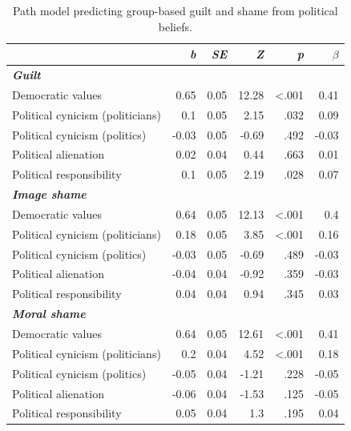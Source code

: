 \documentclass[
]{article}
\begin{document}
\begin{table}[H]
\centering
\caption{\label{tab:TableS1}Path model predicting group-based guilt and shame from political beliefs.}
\centering
\fontsize{8}{10}\selectfont
\begin{tabular}[t]{lrrrrr}
\toprule
\em{ } & \em{b} & \em{SE} & \em{Z} & \em{p} & \em{$\beta$}\\
\midrule
\em{\textbf{Guilt}} & \em{\textbf{}} & \em{\textbf{}} & \em{\textbf{}} & \em{\textbf{}} & \em{\textbf{}}\\
Democratic values & 0.65 & 0.05 & 12.28 & <.001 & 0.41\\
Political cynicism (politicians) & 0.1 & 0.05 & 2.15 & .032 & 0.09\\
Political cynicism (politics) & -0.03 & 0.05 & -0.69 & .492 & -0.03\\
Political alienation & 0.02 & 0.04 & 0.44 & .663 & 0.01\\
\addlinespace
Political responsibility & 0.1 & 0.05 & 2.19 & .028 & 0.07\\
\em{\textbf{Image shame}} & \em{\textbf{}} & \em{\textbf{}} & \em{\textbf{}} & \em{\textbf{}} & \em{\textbf{}}\\
Democratic values & 0.64 & 0.05 & 12.13 & <.001 & 0.4\\
Political cynicism (politicians) & 0.18 & 0.05 & 3.85 & <.001 & 0.16\\
Political cynicism (politics) & -0.03 & 0.05 & -0.69 & .489 & -0.03\\
\addlinespace
Political alienation & -0.04 & 0.04 & -0.92 & .359 & -0.03\\
Political responsibility & 0.04 & 0.04 & 0.94 & .345 & 0.03\\
\em{\textbf{Moral shame}} & \em{\textbf{}} & \em{\textbf{}} & \em{\textbf{}} & \em{\textbf{}} & \em{\textbf{}}\\
Democratic values & 0.64 & 0.05 & 12.61 & <.001 & 0.41\\
Political cynicism (politicians) & 0.2 & 0.04 & 4.52 & <.001 & 0.18\\
\addlinespace
Political cynicism (politics) & -0.05 & 0.04 & -1.21 & .228 & -0.05\\
Political alienation & -0.06 & 0.04 & -1.53 & .125 & -0.05\\
Political responsibility & 0.05 & 0.04 & 1.3 & .195 & 0.04\\
\bottomrule
\end{tabular}
\end{table}
\end{document}
